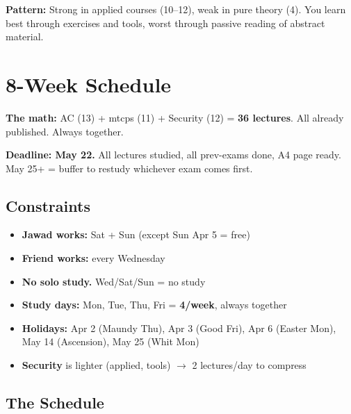\documentclass[11pt,a4paper]{article}
\begin{document}
\textbf{Pattern:} Strong in applied courses (10--12), weak in pure theory (4). You learn best through exercises and tools, worst through passive reading of abstract material.

\section{8-Week Schedule}

\textbf{The math:} AC (13) + mtcps (11) + Security (12) = \textbf{36 lectures}. All already published. Always together.

\textbf{Deadline: May 22.} All lectures studied, all prev-exams done, A4 page ready. May 25+ = buffer to restudy whichever exam comes first.

\subsection{Constraints}

\begin{itemize}[nosep]
\item \textbf{Jawad works:} Sat + Sun (except Sun Apr 5 = free)
\item \textbf{Friend works:} every Wednesday
\item \textbf{No solo study.} Wed/Sat/Sun = no study
\item \textbf{Study days:} Mon, Tue, Thu, Fri = \textbf{4/week}, always together
\item \textbf{Holidays:} Apr 2 (Maundy Thu), Apr 3 (Good Fri), Apr 6 (Easter Mon), May 14 (Ascension), May 25 (Whit Mon)
\item \textbf{Security} is lighter (applied, tools) $\rightarrow$ 2 lectures/day to compress
\end{itemize}

\subsection{The Schedule}
\end{document}
